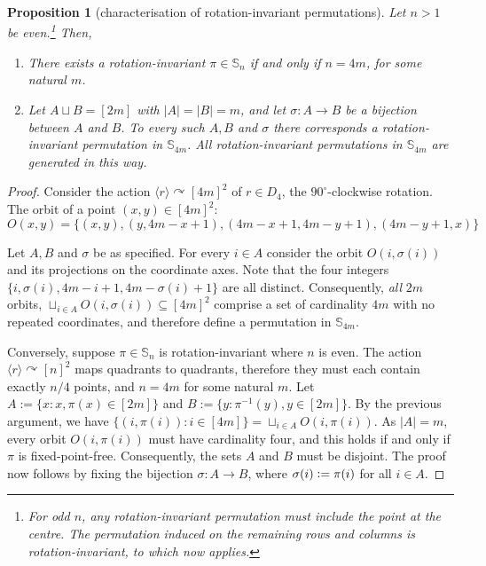 \documentclass{article}
\newtheorem{proposition}[theorem]{Proposition}
\newcommand{\Sn}{\mathbb{S}_n}
\newcommand{\eqdef}{\vcentcolon=}
\theoremstyle{remark}
\def\acts{\curvearrowright}
\theoremstyle{plain}
\begin{document}
\begin{proposition}[characterisation of rotation-invariant permutations]
    \label{prop:char_rotation_inv}
    Let $n>1$ be even.\footnote{For odd $n$, any rotation-invariant permutation \emph{must} include the point at the centre. The permutation induced on the remaining rows and columns is rotation-invariant, to which  now applies.} Then,
    \begin{enumerate}
        \item There exists a rotation-invariant $\pi \in \Sn$ if and only if $n=4m$, for some natural $m$. 
        \item Let $A \sqcup B = [2m]$ with $|A|=|B|=m$, and let $\sigma:A \to B$ be a bijection between $A$ and $B$. To every such $A, B$ and $\sigma$ there corresponds a rotation-invariant permutation in $\mathbb{S}_{4m}$. All rotation-invariant permutations in $\mathbb{S}_{4m}$ are generated in this way. 
    \end{enumerate}
\end{proposition}
\begin{proof}
    Consider the action $\langle r \rangle \acts [4m]^2$ of $r \in D_4$, the $90^{\circ}$-clockwise rotation. The orbit of a point $(x,y) \in [4m]^2$:
    \[
        O(x,y) = \{(x, y), (y, 4m-x+1), (4m-x+1, 4m-y+1), (4m-y+1, x)\}
    \]

    Let $A, B$ and $\sigma$ be as specified.
    For every $i \in A$ consider the orbit $O(i, \sigma(i))$ and its projections on the coordinate axes. Note that the four integers
$\{i, \sigma(i), 4m-i+1, 4m-\sigma(i)+1\}$ are all distinct. 
Consequently, \emph{all} $2m$ orbits, $\sqcup_{i \in A} O(i, \sigma(i)) \subseteq [4m]^2$ comprise a set of cardinality $4m$ with no repeated coordinates, and therefore define a permutation in $\mathbb{S}_{4m}$.
    
    Conversely, suppose $\pi\in\mathbb{S}_n$ is rotation-invariant where $n$ is even. The action $\langle r \rangle \acts [n]^2$ maps quadrants to quadrants, therefore they must each contain exactly $n/4$ points, and $n = 4m$ for some natural $m$. Let $A := \{ x : x,\pi(x) \in [2m] \}$ and $B := \{ y : \pi^{-1}(y),y \in [2m] \}$. By the previous argument, we have $\{ (i, \pi(i)) : i \in [4m] \} = \sqcup_{i \in A} O(i, \pi(i))$. As $|A| = m$, every orbit $O(i, \pi(i))$ must have cardinality four, and this holds if and only if $\pi$ is fixed-point-free. Consequently, the sets $A$ and $B$ must be disjoint. The proof now follows by fixing the bijection $\sigma: A \to B$, where $\sigma(i) \eqdef \pi(i)$ for all $i \in A$.
\end{proof}
\end{document}
